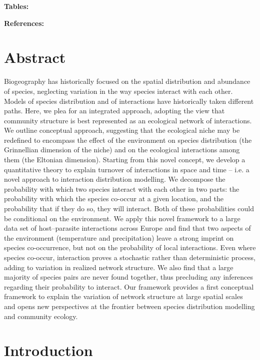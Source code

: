 \documentclass[12pt]{article}
\begin{document}
\textbf{Tables:}     

\textbf{References:} 

\newpage
\doublespacing

\section*{Abstract} 

Biogeography has historically focused on the spatial distribution and
abundance of species, neglecting variation in the way species interact with
each other. Models of species distribution and of interactions have
historically taken different paths. Here, we plea for an integrated approach,
adopting the view that community structure is best represented as an
ecological network of interactions. We outline conceptual approach, suggesting
that the ecological niche may be redefined to encompass the effect of the
environment on species distribution (the Grinnellian dimension of the niche)
and on the ecological interactions among them (the Eltonian dimension).
Starting from this novel concept, we develop a quantitative theory to explain
turnover of interactions in space and time – i.e. a novel approach to
interaction distribution modelling. We decompose the probability with which
two species interact with each other in two parts: the probability with which
the species co-occur at a given location, and the probability that if they do
so, they will interact. Both of these probabilities could be conditional on
the environment. We apply this novel framework to a large data set of
host–parasite interactions across Europe and find that two aspects of the
environment (temperature and precipitation) leave a strong imprint on species
co-occurrence, but not on the probability of local interactions. Even where
species co-occur, interaction proves a stochastic rather than deterministic
process, adding to variation in realized network structure. We also find that
a large majority of species pairs are never found together, thus precluding
any inferences regarding their probability to interact. Our framework provides
a first conceptual framework to explain the variation of network structure at
large spatial scales and opens new perspectives at the frontier between
species distribution modelling and community ecology.

\newpage

\section*{Introduction}
\end{document}
